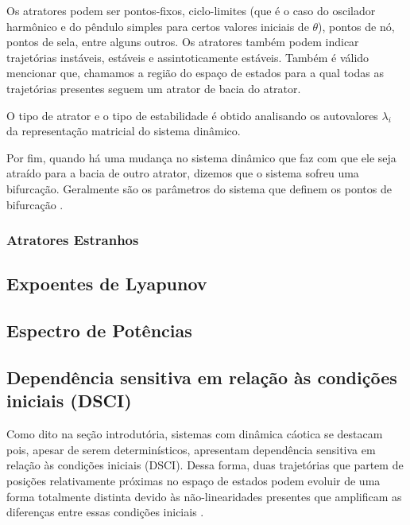 \documentclass[a4paper, 12pt]{article}
\begin{document}
Os atratores podem ser pontos-fixos, ciclo-limites (que é o caso do oscilador harmônico e do pêndulo simples para certos valores iniciais de $\theta$), pontos de nó, pontos de sela, entre alguns outros. Os atratores também podem indicar trajetórias instáveis, estáveis e assintoticamente estáveis. Também é válido mencionar que, chamamos a região do espaço de estados para a qual todas as trajetórias presentes seguem um atrator de bacia do atrator.

O tipo de atrator e o tipo de estabilidade é obtido analisando os autovalores $\lambda_i$ da representação matricial do sistema dinâmico.

Por fim, quando há uma mudança no sistema dinâmico que faz com que ele seja atraído para a bacia de outro atrator, dizemos que o sistema sofreu uma bifurcação. Geralmente são os parâmetros do sistema que definem os pontos de bifurcação \cite{fiedler1994caos}.

\subsubsection{Atratores Estranhos}

\subsection{Expoentes de Lyapunov}

\subsection{Espectro de Potências}

\subsection{Dependência sensitiva em relação às condições iniciais (DSCI)}
Como dito na seção introdutória, sistemas com dinâmica cáotica se destacam pois, apesar de serem determinísticos, apresentam dependência sensitiva em relação às condições iniciais (DSCI). Dessa forma, duas trajetórias que partem de posições relativamente próximas no espaço de estados podem evoluir de uma forma totalmente distinta devido às não-linearidades presentes que amplificam as diferenças entre essas condições iniciais \cite{fiedler1994caos}.
\end{document}
